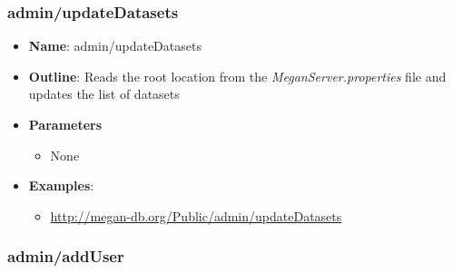 \documentclass[11pt]{article}
\begin{document}
\subsubsection{admin/updateDatasets}
\label{subsubsec:upProp}
\begin{itemize}
	\item \textbf{Name}: admin/updateDatasets
	\item \textbf{Outline}: Reads the root location from the \textit{MeganServer.properties} file and updates the list of datasets
	\item \textbf{Parameters}
		\begin{itemize}
			\item  None
		\end{itemize}
	\item \textbf{Examples}:
		\begin{itemize}
			\item \url{http://megan-db.org/Public/admin/updateDatasets}
		\end{itemize}
\end{itemize}



\subsubsection{admin/addUser}
\end{document}
